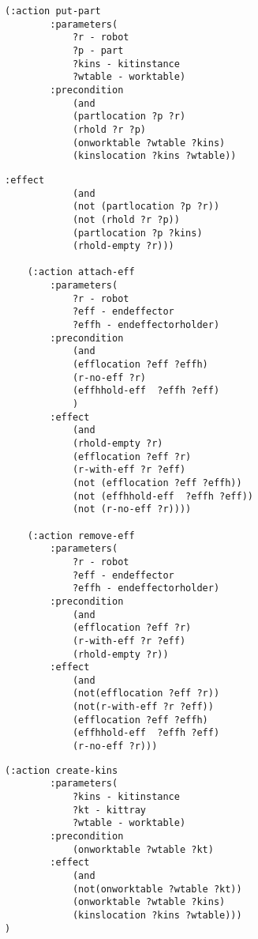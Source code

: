 \begin{appendices}
\begin{minipage}{.5\paperwidth}
\begin{mylisting}
\begin{Verbatim}[commandchars=\\\{\},commandchars=+\[\],fontsize=\small,numbersep=3pt]
	(:action put-part
		:parameters(
			?r - robot
			?p - part
			?kins - kitinstance
			?wtable - worktable)
		:precondition
			(and
			(partlocation ?p ?r)
			(rhold ?r ?p)
			(onworktable ?wtable ?kins)
			(kinslocation ?kins ?wtable))
\end{Verbatim}
\end{mylisting}
\end{minipage}

\begin{minipage}{.5\paperwidth}
\begin{mylisting}
\begin{Verbatim}[commandchars=\\\{\},commandchars=+\[\],fontsize=\small,numbersep=3pt]
		:effect
			(and
			(not (partlocation ?p ?r))
			(not (rhold ?r ?p))
			(partlocation ?p ?kins)
			(rhold-empty ?r)))
			
	(:action attach-eff
		:parameters(
			?r - robot
			?eff - endeffector
			?effh - endeffectorholder)
		:precondition
			(and
			(efflocation ?eff ?effh)
			(r-no-eff ?r)
			(effhhold-eff  ?effh ?eff)
			)
		:effect
			(and
			(rhold-empty ?r)
			(efflocation ?eff ?r)
			(r-with-eff ?r ?eff)
			(not (efflocation ?eff ?effh))
			(not (effhhold-eff  ?effh ?eff))
			(not (r-no-eff ?r))))
	
	(:action remove-eff
		:parameters(
			?r - robot
			?eff - endeffector
			?effh - endeffectorholder)
		:precondition
			(and
			(efflocation ?eff ?r)
			(r-with-eff ?r ?eff)
			(rhold-empty ?r))
		:effect
			(and
			(not(efflocation ?eff ?r))
			(not(r-with-eff ?r ?eff))
			(efflocation ?eff ?effh)
			(effhhold-eff  ?effh ?eff)
			(r-no-eff ?r)))

\end{Verbatim}
\end{mylisting}
\end{minipage}

\begin{minipage}{.5\paperwidth}
\begin{mylisting}
\begin{Verbatim}[commandchars=\\\{\},commandchars=+\[\],fontsize=\small,numbersep=3pt]		
	(:action create-kins
		:parameters(
			?kins - kitinstance
			?kt - kittray
			?wtable - worktable)
		:precondition
			(onworktable ?wtable ?kt)
		:effect
			(and
			(not(onworktable ?wtable ?kt))
			(onworktable ?wtable ?kins)
			(kinslocation ?kins ?wtable)))
)
\end{Verbatim}
\end{mylisting}
\end{minipage}



\end{appendices}
